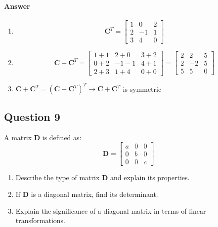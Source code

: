 \documentclass{article}
\begin{document}
\paragraph{Answer}
\begin{enumerate}
    \item $$\mathbf{C}^T = \left[ \begin{array}{ccc} 1 & 0 & 2 \\ 2 & -1 & 1 \\ 3 & 4 & 0 \end{array} \right] $$
    \item $$\mathbf{C} + \mathbf{C}^T = \left[ \begin{array}{ccc} 1+1 & 2+0 & 3+2 \\ 0+2 & -1-1 & 4+1 \\ 2+3 & 1+4 & 0+0 \end{array} \right] = \left[ \begin{array}{ccc} 2 & 2 & 5 \\ 2 & -2 & 5 \\ 5 & 5 & 0 \end{array} \right]$$
    \item $ \mathbf{C} + \mathbf{C}^T = (\mathbf{C} + \mathbf{C}^T)^T \rightarrow \mathbf{C} + \mathbf{C}^T$ is symmetric
\end{enumerate}

\subsection{Question 9}
A matrix $ \mathbf{D} $ is defined as:
$$\mathbf{D} = \left[ \begin{array}{ccc} a & 0 & 0 \\ 0 & b & 0 \\ 0 & 0 & c \end{array} \right]$$
\begin{enumerate}
    \item Describe the type of matrix $ \mathbf{D} $ and explain its properties.
    \item If $ \mathbf{D} $ is a diagonal matrix, find its determinant.
    \item Explain the significance of a diagonal matrix in terms of linear transformations.
\end{enumerate}
\end{document}
